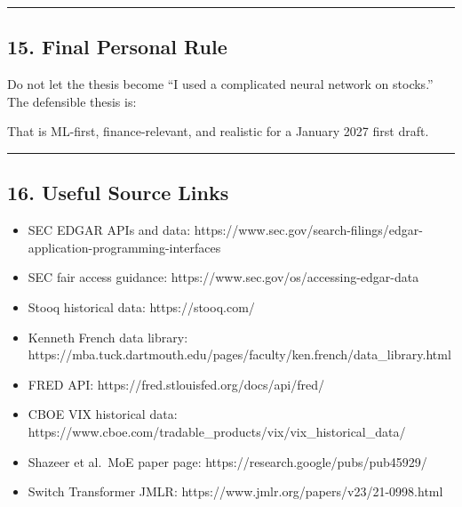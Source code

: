 \begin{center}\rule{0.5\linewidth}{0.5pt}\end{center}

\subsection{15. Final Personal Rule}\label{final-personal-rule}

Do not let the thesis become ``I used a complicated neural network on
stocks.'' The defensible thesis is:

\begin{Shaded}
\begin{Highlighting}[]
\end{Highlighting}
\end{Shaded}

That is ML-first, finance-relevant, and realistic for a January 2027
first draft.

\begin{center}\rule{0.5\linewidth}{0.5pt}\end{center}

\subsection{16. Useful Source Links}\label{useful-source-links}

\begin{itemize}
\tightlist
\item
  SEC EDGAR APIs and data:
  https://www.sec.gov/search-filings/edgar-application-programming-interfaces
\item
  SEC fair access guidance: https://www.sec.gov/os/accessing-edgar-data
\item
  Stooq historical data: https://stooq.com/
\item
  Kenneth French data library:
  https://mba.tuck.dartmouth.edu/pages/faculty/ken.french/data\_library.html
\item
  FRED API: https://fred.stlouisfed.org/docs/api/fred/
\item
  CBOE VIX historical data:
  https://www.cboe.com/tradable\_products/vix/vix\_historical\_data/
\item
  Shazeer et al.~MoE paper page: https://research.google/pubs/pub45929/
\item
  Switch Transformer JMLR: https://www.jmlr.org/papers/v23/21-0998.html
\end{itemize}

